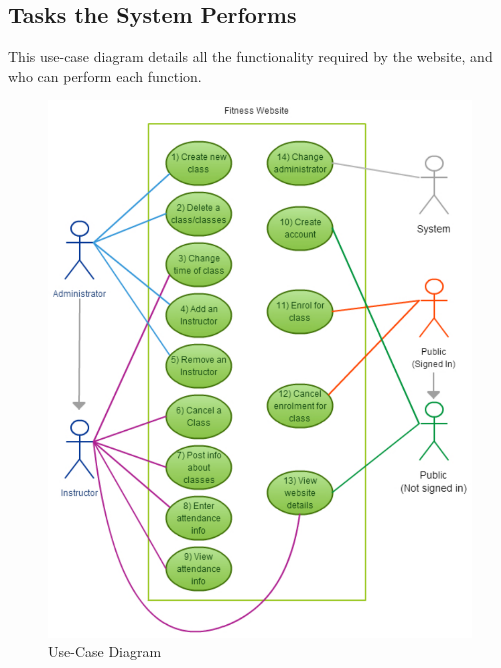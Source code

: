 \documentclass[11pt, article]{article}
\begin{document}
	\newpage
	
	\subsection{Tasks the System Performs}
	This use-case diagram details all the functionality required by the website, and who can perform each function.
	\begin{figure}[ht!]
	\includegraphics[scale=1]{images/usecase}
 	\caption{Use-Case Diagram}
	\end{figure}
	
	\newpage
	
\end{document}

